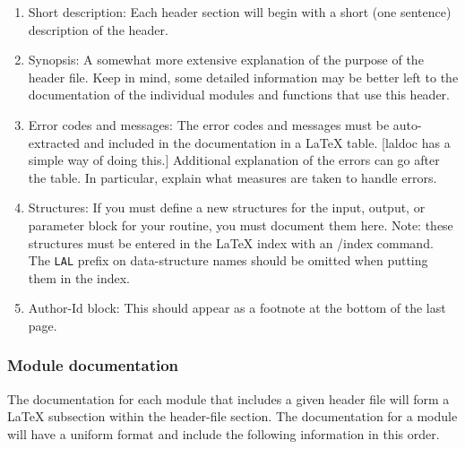 \documentclass[]{ligodcc}
\begin{document}
\begin{enumerate}
\item
Short description: Each header section will begin with a short
(one sentence) description of the header.
\item
Synopsis: A somewhat more extensive explanation of the purpose
of the header file. Keep in mind, some detailed information may be
better left to the documentation of the individual modules and
functions that use this header.
\item
Error codes and messages: The error codes and messages must be
auto-extracted and included in the documentation in a LaTeX table.
[laldoc has a simple way of doing this.] Additional explanation of the
errors can go after the table. In particular, explain what measures
are taken to handle errors.
\item
Structures: If you must define a new structures for the input, output,
or parameter block for your routine, you must document them here.
Note: these structures must be entered in the LaTeX index with an
/index{} command. The {\tt LAL} prefix on data-structure names should be
omitted when putting them in the index.
\item
Author-Id block: This should appear as a footnote at the bottom of the
last page.
\end{enumerate}

\subsubsection{Module documentation}

The documentation for each module that includes a given header file
will form a LaTeX subsection within the header-file section. The
documentation for a module will have a uniform format and include the
following information in this order.
\end{document}
